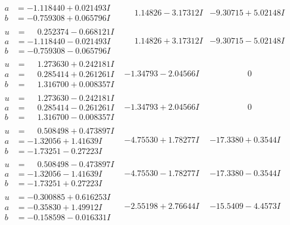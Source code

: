 \documentclass[1p]{elsarticle_modified}
\theoremstyle{definition}
\begin{document}
$$\begin{array}{c|c|c}
\begin{aligned}
a &= -1.118440 + 0.021493 I \\
b &= -0.759308 + 0.065796 I\end{aligned}
 & \phantom{-}1.14826 - 3.17312 I & -9.30715 + 5.02148 I \\ \hline\begin{aligned}
u &= \phantom{-}0.252374 - 0.668121 I \\
a &= -1.118440 - 0.021493 I \\
b &= -0.759308 - 0.065796 I\end{aligned}
 & \phantom{-}1.14826 + 3.17312 I & -9.30715 - 5.02148 I \\ \hline\begin{aligned}
u &= \phantom{-}1.273630 + 0.242181 I \\
a &= \phantom{-}0.285414 + 0.261261 I \\
b &= \phantom{-}1.316700 + 0.008357 I\end{aligned}
 & -1.34793 - 2.04566 I & \phantom{-0.000000 } 0 \\ \hline\begin{aligned}
u &= \phantom{-}1.273630 - 0.242181 I \\
a &= \phantom{-}0.285414 - 0.261261 I \\
b &= \phantom{-}1.316700 - 0.008357 I\end{aligned}
 & -1.34793 + 2.04566 I & \phantom{-0.000000 } 0 \\ \hline\begin{aligned}
u &= \phantom{-}0.508498 + 0.473897 I \\
a &= -1.32056 + 1.41639 I \\
b &= -1.73251 - 0.27223 I\end{aligned}
 & -4.75530 + 1.78277 I & -17.3380 + 0.3544 I \\ \hline\begin{aligned}
u &= \phantom{-}0.508498 - 0.473897 I \\
a &= -1.32056 - 1.41639 I \\
b &= -1.73251 + 0.27223 I\end{aligned}
 & -4.75530 - 1.78277 I & -17.3380 - 0.3544 I \\ \hline\begin{aligned}
u &= -0.300885 + 0.616253 I \\
a &= -0.35830 + 1.49912 I \\
b &= -0.158598 - 0.016331 I\end{aligned}
 & -2.55198 + 2.76644 I & -15.5409 - 4.4573 I \\ \hline\begin{aligned}

\end{aligned}
\end{array}$$
\end{document}
